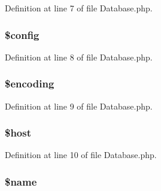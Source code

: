 Definition at line 7 of file Database.\+php.

\hypertarget{class_database_a49c7011be9c979d9174c52a8b83e5d8e}{}
\subsubsection[{\$config}]{\setlength{\rightskip}{0pt plus 5cm}\$config\hspace{0.3cm}{\ttfamily [protected]}}\label{class_database_a49c7011be9c979d9174c52a8b83e5d8e}


Definition at line 8 of file Database.\+php.

\hypertarget{class_database_aee271b7ce67fbe00b9976e6c347cbfbf}{}
\subsubsection[{\$encoding}]{\setlength{\rightskip}{0pt plus 5cm}\$encoding\hspace{0.3cm}{\ttfamily [protected]}}\label{class_database_aee271b7ce67fbe00b9976e6c347cbfbf}


Definition at line 9 of file Database.\+php.

\hypertarget{class_database_a711797613cb863ca0756df789c396bf2}{}
\subsubsection[{\$host}]{\setlength{\rightskip}{0pt plus 5cm}\$host\hspace{0.3cm}{\ttfamily [protected]}}\label{class_database_a711797613cb863ca0756df789c396bf2}


Definition at line 10 of file Database.\+php.

\hypertarget{class_database_ab2fc40d43824ea3e1ce5d86dee0d763b}{}
\subsubsection[{\$name}]{\setlength{\rightskip}{0pt plus 5cm}\$name\hspace{0.3cm}{\ttfamily [protected]}}\label{class_database_ab2fc40d43824ea3e1ce5d86dee0d763b}


